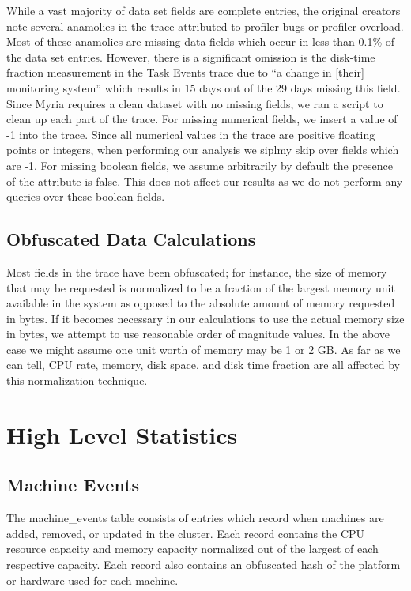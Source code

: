 \documentclass{sig-alternate}
\begin{document}
While a vast majority of data set fields are complete entries, the original creators note several anamolies in the trace attributed to profiler bugs or profiler overload.
Most of these anamolies are missing data fields which occur in less than 0.1\% of the data set entries.
However, there is a significant omission is the disk-time fraction measurement in the Task Events trace due to ``a change in [their] monitoring system'' which results in 15 days out of the 29 days missing this field.
Since Myria requires a clean dataset with no missing fields, we ran a script to clean up each part of the trace.
For missing numerical fields, we insert a value of -1 into the trace.
Since all numerical values in the trace are positive floating points or integers, when performing our analysis we siplmy skip over fields which are -1.
For missing boolean fields, we assume arbitrarily by default the presence of the attribute is false.
This does not affect our results as we do not perform any queries over these boolean fields.

\subsection{Obfuscated Data Calculations}

Most fields in the trace have been obfuscated; for instance, the size of memory that may be requested is normalized to be a fraction of the largest memory unit available in the system as opposed to the absolute amount of memory requested in bytes.
If it becomes necessary in our calculations to use the actual memory size in bytes, we attempt to use reasonable order of magnitude values.
In the above case we might assume one unit worth of memory may be 1 or 2 GB.
As far as we can tell, CPU rate, memory, disk space, and disk time fraction are all affected by this normalization technique.

\section{High Level Statistics}

\subsection{Machine Events}

The machine\_events table consists of entries which record when machines are added, removed, or updated in the cluster.
Each record contains the CPU resource capacity and memory capacity normalized out of the largest of each respective capacity.
Each record also contains an obfuscated hash of the platform or hardware used for each machine.
\end{document}

